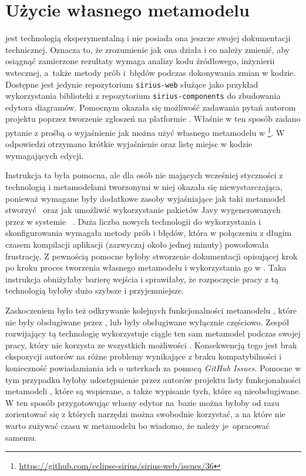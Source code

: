 \section{Użycie własnego metamodelu}

\SiriusWeb{} jest technologią eksperymentalną i nie posiada ona jeszcze
swojej dokumentacji technicznej. Oznacza to, że zrozumienie jak ona działa i co
należy zmienić, aby osiągnąć zamierzone rezultaty wymaga analizy kodu
źródłowego, inżynierii wstecznej, a~także metody prób i~błędów podczas
dokonywania zmian w
kodzie. Dostępne jest jedynie repozytorium \texttt{sirius-web} służące jako
przykład wykorzystania biblioteki z repozytorium \texttt{sirius-components}
do zbudowania edytora diagramów.
Pomocnym okazała się możliwość zadawania pytań autorom projektu poprzez
tworzenie zgłoszeń na platformie \GitHub{}. Właśnie w ten sposób zadano
pytanie z prośbą o wyjaśnienie jak można użyć własnego metamodelu \EMF{} w
\SiriusWeb{}\footnote{
	\url{https://github.com/eclipse-sirius/sirius-web/issues/36}
}. W odpowiedzi otrzymano krótkie wyjaśnienie oraz listę miejsc w kodzie
wymagających edycji.

Instrukcja ta była pomocna, ale dla osób nie mających wcześniej styczności z
technologią \EMF{} i metamodelami tworzonymi w niej okazała się
niewystarczająca, ponieważ wymagane były dodatkowe zasoby wyjaśniające jak taki
metamodel stworzyć~\cite{dokumentacja-sirius-desktop,dokumentacja-aql} oraz jak
umożliwić wykorzystanie pakietów Javy wygenerowanych przez \EMF{} w systemie
\Maven{}~\cite{maven-tycho-tutorial}.
Duża liczba nowych technologii do wykorzystania i skonfigurowania wymagała
metody prób i błędów, która w połączeniu z długim czasem kompilacji aplikacji
(zazwyczaj około jednej minuty) powodowała frustrację. Z pewnością pomocne
byłoby
stworzenie dokumentacji opisującej krok po kroku proces tworzenia własnego
metamodelu i wykorzystania go w \SiriusWeb{}. Taka instrukcja obniżyłaby
barierę wejścia i sprawiłaby, że rozpoczęcie pracy z tą technologią byłoby dużo
szybsze i przyjemniejsze.

Zaskoczeniem było też odkrywanie kolejnych funkcjonalności metamodelu
\EMF{}, które nie były obsługiwane przez \SiriusWeb{}, lub były
obsługiwane wyłącznie częściowo. Zespół rozwijający tą technologię wykorzystuje
ciągle ten sam metamodel podczas swojej pracy, który nie korzysta ze
wszystkich możliwości \EMF{}. Konsekwencją tego jest brak ekspozycji autorów
\SiriusWeb{} na różne problemy wynikające z braku kompatybilności i
konieczność powiadamiania ich o usterkach za pomocą \emph{GitHub Issues}.
Pomocne w tym przypadku byłoby udostępnienie przez autorów projektu listy
funkcjonalności metamodeli \EMF{}, które są wspierane, a także wypisanie
tych, które są nieobsługiwane. W ten sposób przygotowując własny edytor
na~bazie
\SiriusWeb{} można byłoby od razu zorientować się z których narzędzi można
swobodnie korzystać, a na które nie warto zużywać czasu w metamodelu \EMF{}
bo wiadomo, że należy je~opracować samemu.


